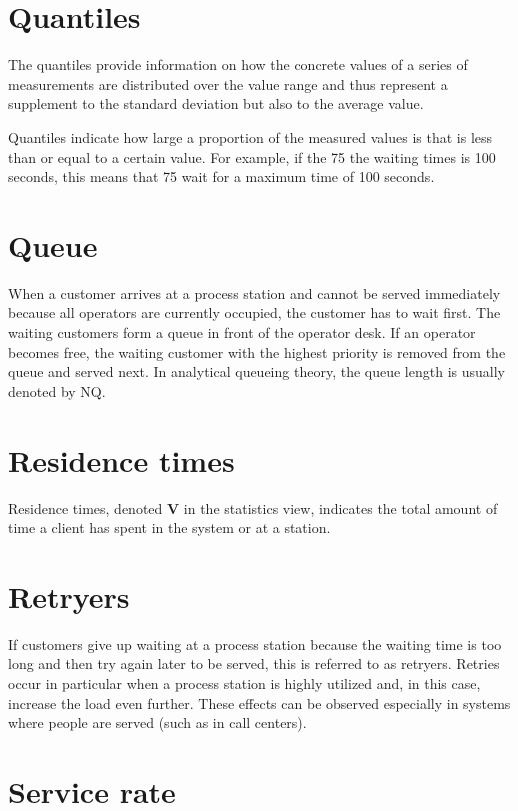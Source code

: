 \section*{Quantiles}


The quantiles provide information on how the concrete values of a series of measurements
are distributed over the value range and thus represent a supplement to the
standard deviation but also to the
average value.


Quantiles indicate how large a proportion of the measured values is that is
less than or equal to a certain value. For example, if the 75%
the waiting times is 100 seconds, this means that 75%
wait for a maximum time of 100 seconds.

\section*{Queue}


When a customer arrives at a process station and cannot
be served immediately because all operators are currently occupied, the customer has to wait first.
The waiting customers form a queue in front of the operator desk. If an operator becomes free,
the waiting customer with the highest priority is removed from the queue and served next.
In analytical queueing theory, the queue length is usually denoted by NQ.

\section*{Residence times}


Residence times, denoted \textbf{V} in the statistics view,
indicates the total amount of time a client has spent in the system or at a station.

\section*{Retryers}


If customers give up waiting at a process station because the waiting time is too long
and then try again later to be served, this is referred to as retryers.
Retries occur in particular when a process station is highly utilized and, in this case,
increase the load even further. These effects can be observed especially in systems
where people are served (such as in call centers).

\section*{Service rate}


